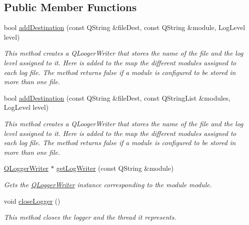 \subsection*{Public Member Functions}
\begin{DoxyCompactItemize}
\item 
bool \mbox{\hyperlink{class_q_logger_1_1_q_logger_manager_a1da2cf60ef400dd30394144754184f8b}{add\+Destination}} (const Q\+String \&file\+Dest, const Q\+String \&module, Log\+Level level)
\begin{DoxyCompactList}\small\item\em This method creates a Q\+Looger\+Writer that stores the name of the file and the log level assigned to it. Here is added to the map the different modules assigned to each log file. The method returns {\itshape false} if a module is configured to be stored in more than one file. \end{DoxyCompactList}\item 
bool \mbox{\hyperlink{class_q_logger_1_1_q_logger_manager_a2ea9564f1c4036f5ac182f92b7b07ed7}{add\+Destination}} (const Q\+String \&file\+Dest, const Q\+String\+List \&modules, Log\+Level level)
\begin{DoxyCompactList}\small\item\em This method creates a Q\+Looger\+Writer that stores the name of the file and the log level assigned to it. Here is added to the map the different modules assigned to each log file. The method returns {\itshape false} if a module is configured to be stored in more than one file. \end{DoxyCompactList}\item 
\mbox{\hyperlink{class_q_logger_1_1_q_logger_writer}{Q\+Logger\+Writer}} $\ast$ \mbox{\hyperlink{class_q_logger_1_1_q_logger_manager_ae0f85687fdbcd17760c38f5b31a61cc9}{get\+Log\+Writer}} (const Q\+String \&module)
\begin{DoxyCompactList}\small\item\em Gets the \mbox{\hyperlink{class_q_logger_1_1_q_logger_writer}{Q\+Logger\+Writer}} instance corresponding to the module {\itshape module}. \end{DoxyCompactList}\item 
\mbox{\label{class_q_logger_1_1_q_logger_manager_ab242b0fffe9b8d33bcdadf5138de2433}} 
void \mbox{\hyperlink{class_q_logger_1_1_q_logger_manager_ab242b0fffe9b8d33bcdadf5138de2433}{close\+Logger}} ()
\begin{DoxyCompactList}\small\item\em This method closes the logger and the thread it represents. \end{DoxyCompactList}\end{DoxyCompactItemize}
